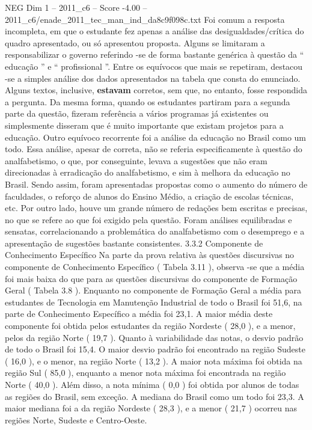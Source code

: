 \begin{textsample}{NEG Dim 1 – 2011\_c6 – Score -4.00 – 2011\_c6/enade\_2011\_tec\_man\_ind\_da8c9f098c.txt}
Foi comum a resposta incompleta, em que o estudante fez apenas a análise das desigualdades/crítica do quadro apresentado, ou só apresentou proposta.
Alguns se limitaram a responsabilizar o governo referindo -se de forma bastante genérica à questão da “ educação ” e “ profissional ”.
Entre os equívocos que mais se repetiram, destacou -se a simples análise dos dados apresentados na tabela que consta do enunciado.
Alguns textos, inclusive, \textbf{estavam} corretos, sem que, no entanto, fosse respondida a pergunta.
Da mesma forma, quando os estudantes partiram para a segunda parte da questão, fizeram referência a vários programas já existentes ou simplesmente disseram que é muito importante que existam projetos para a educação.
Outro equívoco recorrente foi a análise da educação no Brasil como um todo.
Essa análise, apesar de correta, não se referia especificamente à questão do analfabetismo, o que, por conseguinte, levava a sugestões que não eram direcionadas à erradicação do analfabetismo, e sim à melhora da educação no Brasil.
Sendo assim, foram apresentadas propostas como o aumento do número de faculdades, o reforço de alunos do Ensino Médio, a criação de escolas técnicas, etc.
Por outro lado, houve um grande número de redações bem escritas e precisas, no que se refere ao que foi exigido pela questão.
Foram análises equilibradas e sensatas, correlacionando a problemática do analfabetismo com o desemprego e a apresentação de sugestões bastante consistentes. 3.3.2 Componente de Conhecimento Específico Na parte da prova relativa às questões discursivas no componente de Conhecimento Específico ( Tabela 3.11 ), observa -se que a média foi mais baixa do que para as questões discursivas do componente de Formação Geral ( Tabela 3.8 ).
Enquanto no componente de Formação Geral a média para estudantes de Tecnologia em Manutenção Industrial de todo o Brasil foi 51,6, na parte de Conhecimento Específico a média foi 23,1.
A maior média deste componente foi obtida pelos estudantes da região Nordeste ( 28,0 ), e a menor, pelos da região Norte ( 19,7 ).
Quanto à variabilidade das notas, o desvio padrão de todo o Brasil foi 15,4.
O maior desvio padrão foi encontrado na região Sudeste ( 16,0 ), e o menor, na região Norte ( 13,2 ).
A maior nota máxima foi obtida na região Sul ( 85,0 ), enquanto a menor nota máxima foi encontrada na região Norte ( 40,0 ).
Além disso, a nota mínima ( 0,0 ) foi obtida por alunos de todas as regiões do Brasil, sem exceção.
A mediana do Brasil como um todo foi 23,3.
A maior mediana foi a da região Nordeste ( 28,3 ), e a menor ( 21,7 ) ocorreu nas regiões Norte, Sudeste e Centro-Oeste.

\end{textsample}

